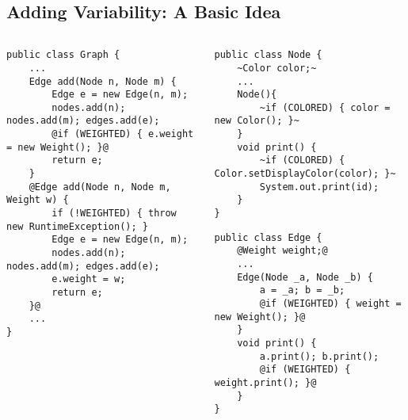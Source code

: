 \subsection{Adding Variability: A Basic Idea}
\begin{frame}[fragile]{\myframetitle}
		\begin{columns}
				\vspace{5mm}
\begin{tiny}
\begin{lstlisting}
public class Graph {
	...
	Edge add(Node n, Node m) {
		Edge e = new Edge(n, m);
		nodes.add(n); nodes.add(m); edges.add(e);
		@if (WEIGHTED) { e.weight = new Weight(); }@
		return e;
	}
	@Edge add(Node n, Node m, Weight w) {
		if (!WEIGHTED) { throw new RuntimeException(); }
		Edge e = new Edge(n, m);
		nodes.add(n); nodes.add(m); edges.add(e);
		e.weight = w;
		return e;
	}@
	...
}
\end{lstlisting}
\end{tiny}	
\begin{tiny}
\begin{lstlisting}
public class Node {
	~Color color;~
	...
	Node(){
		~if (COLORED) { color = new Color(); }~
	}
	void print() {
		~if (COLORED) { Color.setDisplayColor(color); }~
		System.out.print(id);
	}
}
\end{lstlisting}
\begin{lstlisting}
public class Edge {
	@Weight weight;@ 
	...
	Edge(Node _a, Node _b) {
		a = _a; b = _b;
		@if (WEIGHTED) { weight = new Weight(); }@
	}
	void print() {
		a.print(); b.print();
		@if (WEIGHTED) { weight.print(); }@
	}
}
\end{lstlisting}
\end{tiny}	
		\end{columns}
\end{frame}

